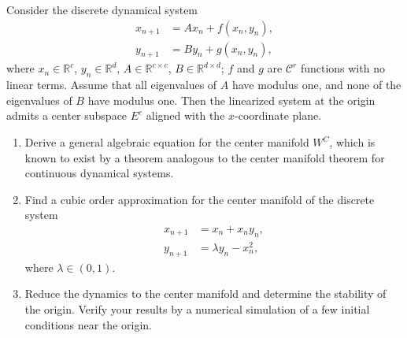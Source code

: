 \begin{exercise}
Consider the discrete dynamical system
\begin{align}
	x_{n+1} &= Ax_n + f(x_n, y_n), \\
	y_{n+1} &= By_n + g(x_n, y_n),
\end{align}
where $x_n \in \mathbb{R}^c$, $y_n \in \mathbb{R}^d$, $A \in \mathbb{R}^{c \times c}$, $B \in \mathbb{R}^{d \times d}$; $f$ and $g$ are $\mathcal{C}^r$ functions with no linear terms. Assume that all eigenvalues of $A$ have modulus one, and none of the eigenvalues of $B$ have modulus one. Then the linearized system at the origin admits a center subspace $E^c$ aligned with the $x$-coordinate plane.

\begin{enumerate}[label=(\alph*)]
	\item Derive a general algebraic equation for the center manifold $W^C$, which is known to exist by a theorem analogous to the center manifold theorem for continuous dynamical systems.
	\item Find a cubic order approximation for the center manifold of the discrete system
	\begin{align}
		x_{n+1} &= x_n + x_ny_n, \\
		y_{n+1} &= \lambda y_n - x_n^2,
	\end{align}
	where $\lambda \in (0,1).$
	\item Reduce the dynamics to the center manifold and determine the stability of the origin. Verify your results by a numerical simulation of a few initial conditions near the origin.
\end{enumerate}
\end{exercise}


